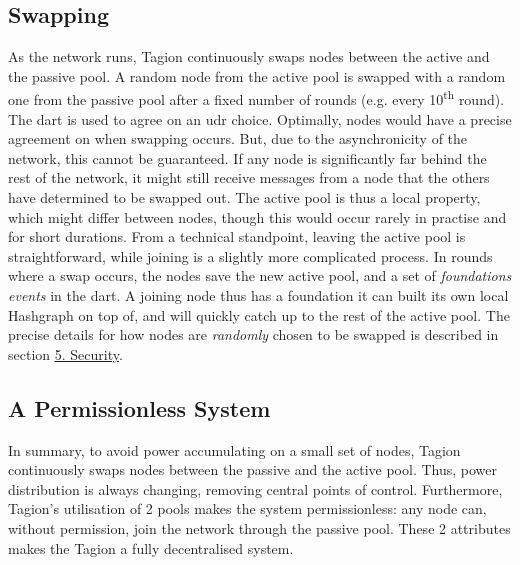 \subsection{Swapping}
    As the network runs, Tagion continuously swaps nodes between the active and the passive pool. A random node from the active pool is swapped with a random one from the passive pool after a fixed number of rounds (e.g. every 10\textsuperscript{th} round). The \gls{dart} is used to agree on an \acrfull{udr} choice. Optimally, nodes would have a precise agreement on when swapping occurs. But, due to the asynchronicity of the network, this cannot be guaranteed. If any node is significantly far behind the rest of the network, it might still receive messages from a node that the others have determined to be swapped out. The active pool is thus a local property, which might differ between nodes, though this would occur rarely in practise and for short durations. From a technical standpoint, leaving the active pool is straightforward, while joining is a slightly more complicated process. In rounds where a swap occurs, the nodes save the new active pool, and a set of \textit{foundations events} in the \gls{dart}. A joining node thus has a foundation it can built its own local Hashgraph on top of, and will quickly catch up to the rest of the active pool. The precise details for how nodes are \textit{randomly} chosen to be swapped is described in section \hyperref[sec:security]{\underline{5. Security}}.

\subsection{A Permissionless System}
    In summary, to avoid power accumulating on a small set of nodes, Tagion continuously swaps nodes between the passive and the active pool. Thus, power distribution is always changing, removing central points of control. Furthermore, Tagion's utilisation of 2 pools makes the system permissionless: any node can, without permission, join the network through the passive pool. These 2 attributes makes the Tagion a fully decentralised system.

\pagebreak